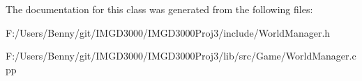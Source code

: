 The documentation for this class was generated from the following files\+:\begin{DoxyCompactItemize}
\item 
F\+:/\+Users/\+Benny/git/\+I\+M\+G\+D3000/\+I\+M\+G\+D3000\+Proj3/include/World\+Manager.\+h\item 
F\+:/\+Users/\+Benny/git/\+I\+M\+G\+D3000/\+I\+M\+G\+D3000\+Proj3/lib/src/\+Game/World\+Manager.\+cpp\end{DoxyCompactItemize}
